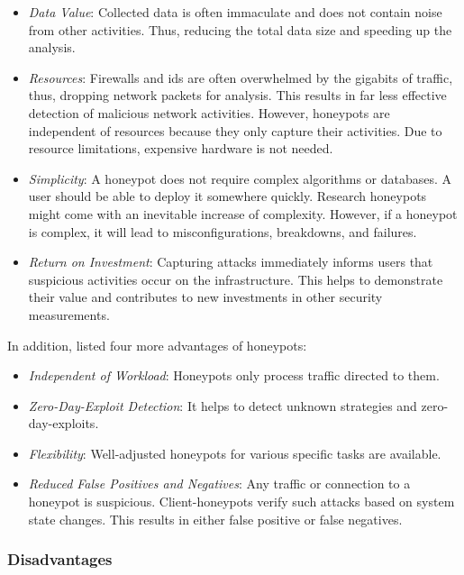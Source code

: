 \begin{itemize}
    \item \textit{Data Value}: Collected data is often immaculate and does not contain noise from other activities.
          Thus, reducing the total data size and speeding up the analysis.
    \item \textit{Resources}: Firewalls and \ac{ids} are often overwhelmed by the gigabits of traffic, thus, dropping network packets for analysis.
          This results in far less effective detection of malicious network activities.
          However, honeypots are independent of resources because they only capture their activities.
          Due to resource limitations, expensive hardware is not needed.
    \item \textit{Simplicity}: A honeypot does not require complex algorithms or databases.
          A user should be able to deploy it somewhere quickly.
          Research honeypots might come with an inevitable increase of complexity.
          However, if a honeypot is complex, it will lead to misconfigurations, breakdowns, and failures.
    \item \textit{Return on Investment}: Capturing attacks immediately informs users that suspicious activities occur on the infrastructure.
          This helps to demonstrate their value and contributes to new investments in other security measurements.
\end{itemize}

In addition, \citet{NawrockiWSKS2016} listed four more advantages of honeypots:

\begin{itemize}
    \item \textit{Independent of Workload}: Honeypots only process traffic directed to them.
    \item \textit{Zero-Day-Exploit Detection}: It helps to detect unknown strategies and zero-day-exploits.
    \item \textit{Flexibility}: Well-adjusted honeypots for various specific tasks are available.
    \item \textit{Reduced False Positives and Negatives}: Any traffic or connection to a honeypot is suspicious.
          Client-honeypots verify such attacks based on system state changes.
          This results in either false positive or false negatives.
\end{itemize}

\subsubsection{Disadvantages}


